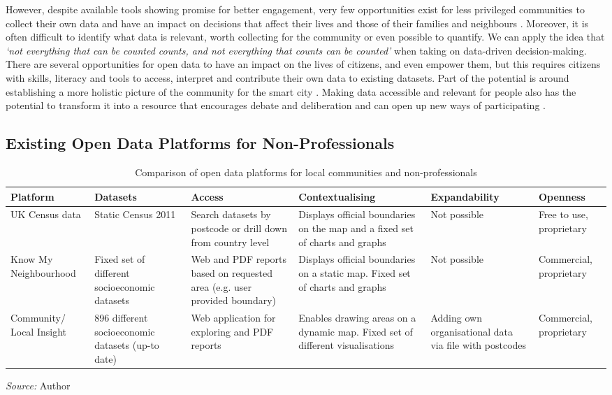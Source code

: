 However, despite available tools showing promise for better engagement, very few opportunities exist for less privileged communities to collect their own data and have an impact on decisions that affect their lives and those of their families and neighbours \citep{colomb_participation_2017}. Moreover, it is often difficult to identify what data is relevant, worth collecting for the community or even possible to quantify. We can apply the idea that \textit{`not everything that can be counted counts, and not everything that counts can be counted'} \citep[p. 1-14]{cameron_william_bruce_informal_1963} when taking on data-driven decision-making. There are several opportunities for open data to have an impact on the lives of citizens, and even empower them, but this requires citizens with skills, literacy and tools to access, interpret and contribute their own data to existing datasets. Part of the potential is around establishing a more holistic picture of the community for the smart city \citep{townsend_smart_2013}. Making data accessible and relevant for people also has the potential to transform it into a resource that encourages debate and deliberation and can open up new ways of participating \citep{hansen_civic_2014,balestrini_iot_2015}.

\subsection{Existing Open Data Platforms for Non-Professionals}
\label{sec:platforms}

\begin{table}[hbt!]
\scriptsize
\centering
\begin{tabular}{|l|p{20mm}|p{25mm}|p{25mm}|p{19mm}|p{15mm}|}
  \hline
  \textbf{Platform} & \textbf{Datasets} & \textbf{Access} & \textbf{Contextualising} & \textbf{Expandability} & \textbf{Openness} \\ [0.5ex]
  \hline
  UK Census data & Static Census 2011 & Search datasets by postcode or drill down from country level & Displays official boundaries on the map and a fixed set of charts and
graphs & Not possible & Free to use, proprietary \\
  \hline
  Know My Neighbourhood & Fixed set of different socioeconomic datasets & Web and PDF reports based on requested area (e.g. user provided boundary) & Displays official boundaries on a static map. Fixed set of charts and graphs & Not possible & Commercial, proprietary \\
  \hline
  Community/ Local Insight & 896 different socioeconomic datasets (up-to date) & Web application for exploring and PDF reports & Enables drawing areas on a dynamic map. Fixed set of different visualisations & Adding own organisational data via file with postcodes & Commercial, proprietary \\ [0.5ex]
  \hline
\end{tabular}

\smallskip\centering
    \footnotesize\emph{Source:} Author
\caption[Open Data Platforms for Non-Professionals]{Comparison of open data platforms for local communities and non-professionals}
\label{table:comm_portals}
\end{table}


